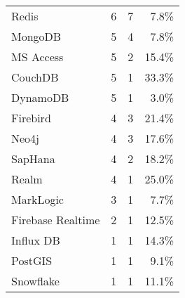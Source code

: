 \begin{tabular}{lrrr}
                 Redis &                        6 &                    7 &                 7.8\% \\
               MongoDB &                        5 &                    4 &                 7.8\% \\
             MS Access &                        5 &                    2 &                15.4\% \\
               CouchDB &                        5 &                    1 &                33.3\% \\
              DynamoDB &                        5 &                    1 &                 3.0\% \\
              Firebird &                        4 &                    3 &                21.4\% \\
                 Neo4j &                        4 &                    3 &                17.6\% \\
               SapHana &                        4 &                    2 &                18.2\% \\
                 Realm &                        4 &                    1 &                25.0\% \\
             MarkLogic &                        3 &                    1 &                 7.7\% \\
     Firebase Realtime &                        2 &                    1 &                12.5\% \\
             Influx DB &                        1 &                    1 &                14.3\% \\
               PostGIS &                        1 &                    1 &                 9.1\% \\
             Snowflake &                        1 &                    1 &                11.1\% \\
\hline
\end{tabular}
